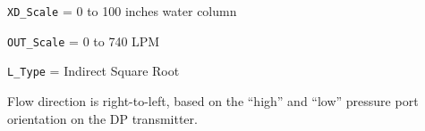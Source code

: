 
{\tt XD\_Scale} = 0 to 100 inches water column

\vskip 10pt

{\tt OUT\_Scale} = 0 to 740 LPM

\vskip 10pt

{\tt L\_Type} = Indirect Square Root

\vskip 10pt

Flow direction is right-to-left, based on the ``high'' and ``low'' pressure port orientation on the DP transmitter.




